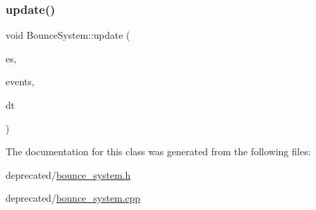 \mbox{\label{classBounceSystem_aeae5238af04e5eec67acd6ad897b9c3f}} 
\subsubsection{\texorpdfstring{update()}{update()}}
{\footnotesize\ttfamily void Bounce\+System\+::update (\begin{DoxyParamCaption}\item[{ex\+::\+Entity\+Manager \&}]{es,  }\item[{ex\+::\+Event\+Manager \&}]{events,  }\item[{ex\+::\+Time\+Delta}]{dt }\end{DoxyParamCaption})\hspace{0.3cm}{\ttfamily [override]}}



The documentation for this class was generated from the following files\+:\begin{DoxyCompactItemize}
\item 
deprecated/\hyperlink{bounce__system_8h}{bounce\+\_\+system.\+h}\item 
deprecated/\hyperlink{bounce__system_8cpp}{bounce\+\_\+system.\+cpp}\end{DoxyCompactItemize}
